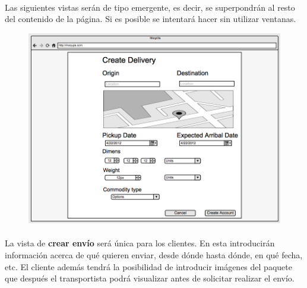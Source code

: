 \documentclass[10pt, a4paper,spanish]{article}
\begin{document}
			\paragraph{}
			Las siguientes vistas serán de tipo emergente, es decir, se superpondrán al resto del contenido de la página. Si es posible se intentará hacer sin utilizar ventanas.


			\begin{figure}[H]
				\centering
				\begin{minipage}[b]{0.7\textwidth}
					\includegraphics[width=\textwidth]{res/sketch_create_delivery.png}

				\end{minipage}
			\end{figure}

			\paragraph{}
			La vista de \textbf{crear envío} será única para los clientes. En esta introducirán información acerca de qué quieren enviar, desde dónde hasta dónde, en qué fecha, etc. El cliente además tendrá la posibilidad de introducir imágenes del paquete que después el transportista podrá visualizar antes de solicitar realizar el envío.
\end{document}
